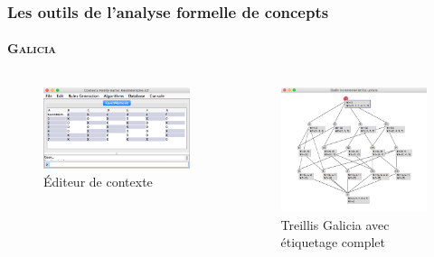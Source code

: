 \documentclass[french]{beamer}
\begin{document}
\begin{frame}
\frametitle{Les outils de l'analyse formelle de concepts}
\framesubtitle{\textsc{Galicia}}
\begin{columns}[c] %
\begin{figure}[H]
\label{fig:galicia-ctx}
\begin{center}\includegraphics[scale=0.28]{figures/galicia1.jpg}\end{center}
\caption{Éditeur de contexte}
\end{figure}
\begin{figure}[H]
\begin{center}\includegraphics[scale=0.30]{figures/galicia-full-labeling.png}\end{center}
\caption{Treillis Galicia avec étiquetage complet}
\label{cap:fig:galicia-full-label}
\end{figure}
\end{columns}
\end{frame}
\end{document}
